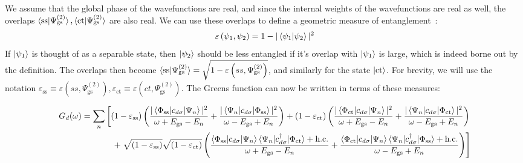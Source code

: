 \documentclass[reprint,superscriptaddress,floatfix]{revtex4-2}
\begin{document}
We assume that the global phase of the wavefunctions are real, and since the internal weights of the wavefunctions are real as well, the overlaps \(\braket{\text{ss}|\Psi^{(2)}_\text{gs}},\braket{\text{ct}|\Psi^{(2)}_\text{gs}}\) are also real. We can use these overlaps to define a geometric measure of entanglement~\cite{shimony1995degree,wei2003geometric,horodecki2009quantum}:
\begin{equation}\begin{aligned}
	\varepsilon\left(\psi_1,\psi_2\right) = 1 - |\braket{\psi_1 | \psi_2}|^2
\end{aligned}\end{equation}
If \(\ket{\psi_1}\) is thought of as a separable state, then \(\ket{\psi_2}\) should be less entangled if it's overlap with \(\ket{\psi_1}\) is large, which is indeed borne out by the definition.
The overlaps then become \(\braket{\text{ss}|\Psi^{(2)}_\text{gs}} = \sqrt{1 - \varepsilon\left(ss,\Psi^{(2)}_\text{gs}\right)}\), and similarly for the state \(\ket{\text{ct}}\). For brevity, we will use the notation \(\varepsilon_\text{ss} \equiv \varepsilon\left(ss,\Psi^{(2)}_\text{gs}\right), \varepsilon_\text{ct} \equiv \varepsilon\left(ct,\Psi^{(2)}_\text{gs}\right)\). The Greens function can now be written in terms of these measures:
\begin{widetext}
\begin{equation}\begin{aligned}
	G_d(\omega) = \sum_n \left[\left(1 - \varepsilon_\text{ss} \right) \left(\frac{|\braket{\Phi_\text{ss} | c_{d\sigma} | \Psi_n}|^2}{\omega + E_\text{gs} - E_n} + \frac{|\braket{\Psi_n | c_{d\sigma} | \Phi_\text{ss}}|^2}{\omega - E_\text{gs} + E_n}\right) + \left(1 - \varepsilon_\text{ct} \right) \left(\frac{|\braket{\Phi_\text{ct} | c_{d\sigma} | \Psi_n}|^2}{\omega + E_\text{gs} - E_n} + \frac{|\braket{\Psi_n | c_{d\sigma} | \Phi_\text{ct}}|^2}{\omega - E_\text{gs} + E_n}\right)\right.\\
	+ \left. \sqrt{\left(1 - \varepsilon_\text{ss} \right)}\sqrt{\left(1 - \varepsilon_\text{ct} \right)} \left(\frac{\braket{\Phi_\text{ss} | c_{d\sigma} | \Psi_n}\braket{\Psi_n | c^\dagger_{d\sigma} | \Phi_\text{ct}} + \text{h.c.}}{\omega + E_\text{gs} - E_n} + \frac{\braket{\Phi_\text{ct} | c_{d\sigma} | \Psi_n}\braket{\Psi_n | c^\dagger_{d\sigma} | \Phi_\text{ss}} + \text{h.c.}}{\omega - E_\text{gs} + E_n}\right)\right]
\end{aligned}\end{equation}
\end{widetext}
\end{document}
